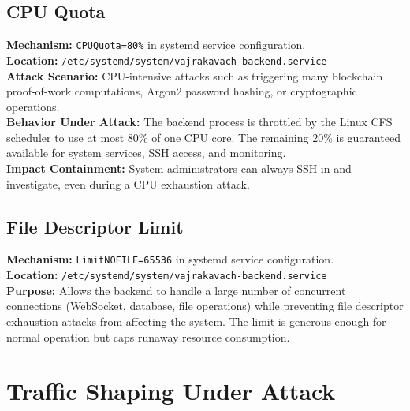 \documentclass[11pt,a4paper]{article}
\begin{document}
\subsection{CPU Quota}

\begin{tcolorbox}[colback=toleranceamber!5, colframe=toleranceamber]
\textbf{Mechanism:} \texttt{CPUQuota=80\%} in systemd service configuration.\\
\textbf{Location:} \texttt{/etc/systemd/system/vajrakavach-backend.service}\\
\textbf{Attack Scenario:} CPU-intensive attacks such as triggering many blockchain proof-of-work computations, Argon2 password hashing, or cryptographic operations.\\
\textbf{Behavior Under Attack:} The backend process is throttled by the Linux CFS scheduler to use at most 80\% of one CPU core. The remaining 20\% is guaranteed available for system services, SSH access, and monitoring.\\
\textbf{Impact Containment:} System administrators can always SSH in and investigate, even during a CPU exhaustion attack.
\end{tcolorbox}

\subsection{File Descriptor Limit}

\begin{tcolorbox}[colback=toleranceamber!5, colframe=toleranceamber]
\textbf{Mechanism:} \texttt{LimitNOFILE=65536} in systemd service configuration.\\
\textbf{Location:} \texttt{/etc/systemd/system/vajrakavach-backend.service}\\
\textbf{Purpose:} Allows the backend to handle a large number of concurrent connections (WebSocket, database, file operations) while preventing file descriptor exhaustion attacks from affecting the system. The limit is generous enough for normal operation but caps runaway resource consumption.
\end{tcolorbox}

\section{Traffic Shaping Under Attack}
\end{document}
